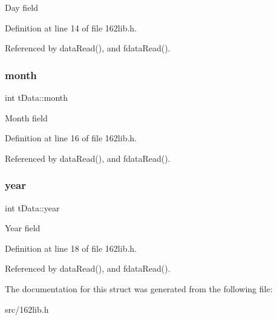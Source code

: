 Day field 

Definition at line 14 of file 162lib.\+h.



Referenced by data\+Read(), and fdata\+Read().

\mbox{\label{structtData_a09255da5529c4457e9bac181f6ebabac}} 
\subsubsection{\texorpdfstring{month}{month}}
{\footnotesize\ttfamily int t\+Data\+::month}

Month field 

Definition at line 16 of file 162lib.\+h.



Referenced by data\+Read(), and fdata\+Read().

\mbox{\label{structtData_abc54df4b847929f10f39352918fe0e0f}} 
\subsubsection{\texorpdfstring{year}{year}}
{\footnotesize\ttfamily int t\+Data\+::year}

Year field 

Definition at line 18 of file 162lib.\+h.



Referenced by data\+Read(), and fdata\+Read().



The documentation for this struct was generated from the following file\+:\begin{DoxyCompactItemize}
\item 
src/162lib.\+h\end{DoxyCompactItemize}
